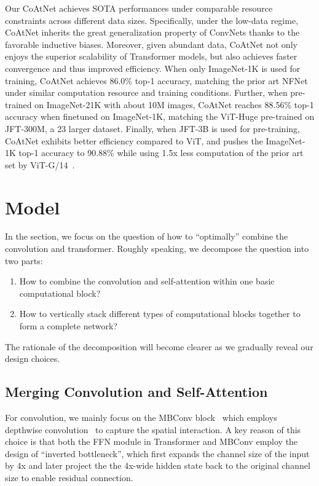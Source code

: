 \documentclass{article}
\newcommand{\name}{CoAtNet\xspace}
\begin{document}
Our \name achieves SOTA performances under comparable resource constraints across different data sizes.
Specifically, under the low-data regime, \name inherits the great generalization property of ConvNets thanks to the favorable inductive biases.
Moreover, given abundant data, \name not only enjoys the superior scalability of Transformer models, but also achieves faster convergence and thus improved efficiency.
When only ImageNet-1K is used for training, \name achieves 86.0\% top-1 accuracy, matching the prior art NFNet~\cite{brock2021high} under similar computation resource and training conditions.
Further, when pre-trained on ImageNet-21K with about 10M images, \name reaches 88.56\% top-1 accuracy when finetuned on ImageNet-1K, matching the ViT-Huge pre-trained on JFT-300M, a 23 larger dataset.
Finally, when JFT-3B is used for pre-training, \name exhibits better efficiency compared to ViT, and pushes the ImageNet-1K top-1 accuracy to 90.88\% while using 1.5x less computation of the prior art set by ViT-G/14~\cite{zhai2021scaling}.

\section{Model}
\label{sec:model}
In the section, we focus on the question of how to ``optimally'' combine the convolution and transformer.
Roughly speaking, we decompose the question into two parts:
\begin{enumerate}[itemsep=0pt,topsep=0pt,partopsep=0pt]
    \item How to combine the convolution and self-attention within one basic computational block?
    \item How to vertically stack different types of computational blocks together to form a complete network?
\end{enumerate}
The rationale of the decomposition will become clearer as we gradually reveal our design choices.

\subsection{Merging Convolution and Self-Attention}
For convolution, we mainly focus on the MBConv block~\cite{sandler2018mobilenetv2} which employs depthwise convolution~\cite{sepconv14} to capture the spatial interaction.
A key reason of this choice is that both the FFN module in Transformer and MBConv employ the design of ``inverted bottleneck'', which first expands the channel size of the input by 4x and later project the 
the 4x-wide hidden state back to the original channel size to enable residual connection.
\end{document}
